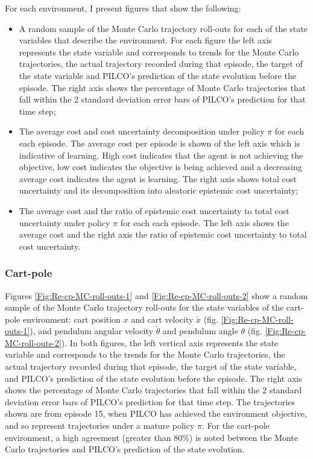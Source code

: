 For each environment, I present figures that show the following:
\begin{itemize}
    \item A random sample of the Monte Carlo trajectory roll-outs for each of the state variables that describe the environment. For each figure the left axis represents the state variable and corresponds to trends for the Monte Carlo trajectories, the actual trajectory recorded during that episode, the target of the state variable and PILCO's prediction of the state evolution before the episode. The right axis shows the percentage of Monte Carlo trajectories that fall within the 2 standard deviation error bars of PILCO's prediction for that time step;
    \item The average cost and cost uncertainty decomposition under policy $\pi$ for each each episode. The average cost per episode is shown of the left axis which is indicative of learning. High cost indicates that the agent is not achieving the objective, low cost indicates the objective is being achieved and a decreasing average cost indicates the agent is learning. The right axis shows total cost uncertainty and its decomposition into aleatoric epistemic cost uncertainty;
    \item The average cost and the ratio of epistemic cost uncertainty to total cost uncertainty under policy $\pi$ for each each episode. The left axis shows the average cost and the right axis the ratio of epistemic cost uncertainty to total cost uncertainty.
\end{itemize}

\subsubsection{Cart-pole}
Figures \ref{Fig:Re-cp-MC-roll-outs-1} and \ref{Fig:Re-cp-MC-roll-outs-2} show a random sample of the Monte Carlo trajectory roll-outs for the state variables of the cart-pole environment: cart position $x$ and cart velocity $\dot{x}$ (fig. \ref{Fig:Re-cp-MC-roll-outs-1}), and pendulum angular velocity $\dot \theta$ and pendulum angle $\theta$ (fig. \ref{Fig:Re-cp-MC-roll-outs-2}). In both figures, the left vertical axis represents the state variable and corresponds to the trends for the Monte Carlo trajectories, the actual trajectory recorded during that episode, the target of the state variable, and PILCO's prediction of the state evolution before the episode. The right axis shows the percentage of Monte Carlo trajectories that fall within the 2 standard deviation error bars of PILCO's prediction for that time step. The trajectories shown are from episode 15, when PILCO has achieved the environment objective, and so represent trajectories under a mature policy $\pi$. For the cart-pole environment, a high agreement (greater than $80\%$) is noted between the Monte Carlo trajectories and PILCO's prediction of the state evolution.

